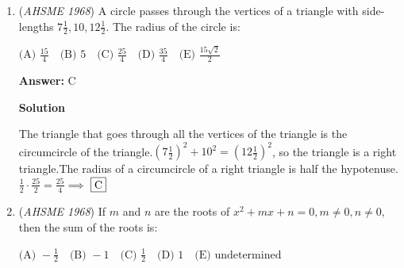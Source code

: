 \begin{enumerate}
 $\text{(A) } 16:9\quad \text{(B) } 9:16\quad \text{(C) } 4:3\quad \text{(D) } 3:4\quad \text{(E) } \text{none of these}$

 \textbf{Answer: }B



\textbf{Solution}

Let the length of the two arcs be denoted $x$. First, we acknowledge that the length of an \href{https://artofproblemsolving.com/wiki/index.php?title=Arc}{arc} of a circle is given by the measure of that arc's \href{https://artofproblemsolving.com/wiki/index.php?title=Central\_angle}{central angle} in \href{https://artofproblemsolving.com/wiki/index.php?title=Radians}{radians} times the radius of that circle. Note that the central angle of circle $I$ measures $\frac{\pi}{3}$ radians, and the central angle of circle $II$ measures $\frac{\pi}{4}$ radians. Let the radius of circle $I$ be $r_1$ and the radius of circle $II$ be $r_2$. Then, we know that the arc length $x=\frac{\pi}{3}r_1=\frac{\pi}{4}r_2$, and so $\frac{r_1}{r_2}=\frac{3}{4}$. From this, we see that $\frac{r_1^2}{r_2^2}=\frac{\pi r_1^2}{\pi r_2^2}=\frac{[I]}{[II]}=\frac{9}{16}$. Thus, our answer is $\fbox{(B) 9:16}$.

 


	\item (\textit{AHSME 1968}) A circle passes through the vertices of a triangle with side-lengths $7\frac{1}{2},10,12\frac{1}{2}.$ The radius of the circle is:


 $\text{(A) } \frac{15}{4}\quad \text{(B) } 5\quad \text{(C) } \frac{25}{4}\quad \text{(D) } \frac{35}{4}\quad \text{(E) } \frac{15\sqrt{2}}{2}$

 \textbf{Answer: }C



\textbf{Solution}

The triangle that goes through all the vertices of the triangle is the circumcircle of the triangle.$(7\frac{1}{2})^{2}+10^{2}=(12\frac{1}{2})^{2}$, so the triangle is a right triangle.The radius of a circumcircle of a right triangle is half the hypotenuse. $\frac{1}{2}\cdot \frac{25}{2}=\frac{25}{4}\implies$ $\fbox{C}$



	\item (\textit{AHSME 1968}) If $m$ and $n$ are the roots of $x^2+mx+n=0 ,m \ne 0,n \ne 0$, then the sum of the roots is:


 $\text{(A) } -\frac{1}{2}\quad \text{(B) } -1\quad \text{(C) } \frac{1}{2}\quad \text{(D) } 1\quad \text{(E) } \text{undetermined}$


\end{enumerate}
